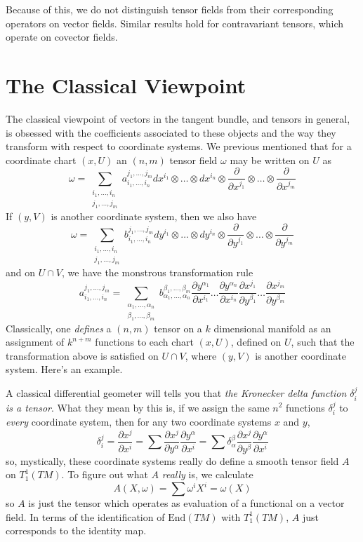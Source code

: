 Because of this, we do not distinguish tensor fields from their corresponding operators on vector fields. Similar results hold for contravariant tensors, which operate on covector fields.

\section{The Classical Viewpoint}

The classical viewpoint of vectors in the tangent bundle, and tensors in general, is obsessed with the coefficients associated to these objects and the way they transform with respect to coordinate systems. We previous mentioned that for a coordinate chart $(x,U)$ an $(n,m)$ tensor field $\omega$ may be written on $U$ as
%
\[ \omega = \sum_{\substack{i_1, \dots, i_n\\j_1, \dots, j_m}} a_{i_1, \dots, i_n}^{j_1, \dots, j_m} dx^{i_1} \otimes \dots \otimes dx^{i_n} \otimes \frac{\partial}{\partial x^{j_1}} \otimes \dots \otimes \frac{\partial}{\partial x^{j_m}} \]
%
If $(y,V)$ is another coordinate system, then we also have
%
\[ \omega = \sum_{\substack{i_1, \dots, i_n\\j_1, \dots, j_m}} b_{i_1, \dots, i_n}^{j_1, \dots, j_m} dy^{i_1} \otimes \dots \otimes dy^{i_n} \otimes \frac{\partial}{\partial y^{j_1}} \otimes \dots \otimes \frac{\partial}{\partial y^{j_m}} \]
%
and on $U \cap V$, we have the monstrous transformation rule
%
\[ a_{i_1, \dots, i_n}^{j_1, \dots, j_m} = \sum_{\substack{\alpha_1, \dots, \alpha_n\\\beta_1, \dots, \beta_m}} b_{\alpha_1, \dots, \alpha_n}^{\beta_1, \dots, \beta_m} \frac{\partial y^{\alpha_1}}{\partial x^{i_1}} \dots \frac{\partial y^{\alpha_n}}{\partial x^{i_n}} \frac{\partial x^{j_1}}{\partial y^{\beta_1}} \dots \frac{\partial x^{j_m}}{\partial y^{\beta_m}} \]
%
Classically, one {\it defines} a $(n,m)$ tensor on a $k$ dimensional manifold as an assignment of $k^{n + m}$ functions to each chart $(x,U)$, defined on $U$, such that the transformation above is satisfied on $U \cap V$, where $(y,V)$ is another coordinate system. Here's an example.

\begin{example}
    A classical differential geometer will tells you that {\it the Kronecker delta function $\delta_i^j$ is a tensor}. What they mean by this is, if we assign the same $n^2$ functions $\delta_i^j$ to {\it every} coordinate system, then for any two coordinate systems $x$ and $y$,
    \[ \delta_i^j = \frac{\partial x^j}{\partial x^i} = \sum \frac{\partial x^j}{\partial y^\alpha} \frac{\partial y^\alpha}{\partial x^i} = \sum \delta_\alpha^\beta \frac{\partial x^j}{\partial y^\beta} \frac{\partial y^\alpha}{\partial x^i} \]
    so, mystically, these coordinate systems really do define a smooth tensor field $A$ on $T_1^1(TM)$. To figure out what $A$ {\it really} is, we calculate
    \[ A(X,\omega) = \sum \omega^i X^i = \omega(X) \]
    so $A$ is just the tensor which operates as evaluation of a functional on a vector field. In terms of the identification of $\text{End}(TM)$ with $T_1^1(TM)$, $A$ just corresponds to the identity map.
\end{example}

